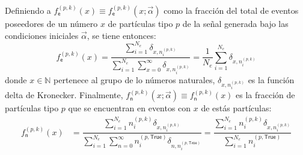 Definiendo a $f^{(p, k)}_\textsf{e} (x)\equiv f^{(p, k)}_\textsf{e} (x; \vec{\alpha})$ como la fracción del total de eventos poseedores de un número $x$ de partículas tipo $p$ de la señal generada bajo las condiciones iniciales $\vec{\alpha}$, %
se tiene entonces:
\begin{equation}\label{fe}
f^{(p, k)}_\textsf{e} (x)  = \dfrac{\sum\limits_{i=1}^{N_e} \delta_{x,n_i^{(p,k)}}}{\sum\limits_{i=1}^{N_e} \sum\limits_{x=0}^\infty \delta_{x,n_i^{(p,k)}}} = \dfrac{1}{N_e} \sum_{i=1}^{N_e} \delta_{x,n_i^{(p,k)}}
\end{equation}
donde $x\in\mathbb{N}$ pertenece al grupo de lo números naturales, $\delta_{x,n_i^{(p,k)}}$ es la función delta de Kronecker. %
Finalmente, $f^{(p, k)}_\textsf{n} (x; \vec{\alpha}) \equiv f^{(p, k)}_\textsf{n} (x)$ es la fracción de partículas tipo $p$ que se encuentran en eventos con $x$ de estás partículas:
\begin{eqnarray}\label{fn}
f^{(p, k)}_\textsf{n} (x) & = \dfrac{\sum\limits_{i=1}^{N_e} n_i^{(p,k)} \delta_{x,n_i^{(p,k)}}}{\sum\limits_{i=1}^{N_e} \sum\limits_{n=0}^\infty n_i^{(p,\textsf{True})} \delta_{n, n_i^{(p,\textsf{True})}}}  = \dfrac{\sum\limits_{i=1}^{N_e} n_i^{(p,k)} \delta_{x, n_i^{(p,k)}}}{\sum\limits_{i=1}^{N_e} n_i^{(p,\textsf{True})}}
\end{eqnarray}


